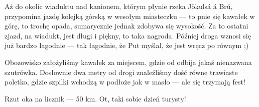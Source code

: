 
Aż do okolic wiaduktu nad kanionem, którym płynie rzeka Jökulsá á Brú,  przypomina jazdę kolejką górską w wesołym miasteczku --- to pnie się kawałek w górę, to trochę opada, sumarycznie jednak zdobywa się wysokość. Za to ostatni zjazd, na wiadukt, jest długi i piękny, to taka nagroda. Później droga wznosi się już bardzo łagodnie --- tak łagodnie, że Put myślał, że jest wręcz po równym ;)

Obozowisko założyliśmy kawałek za miejscem, gdzie od  odbija jakaś nienazwana szutrówka. Dosłownie dwa metry od drogi znaleźliśmy dość równe trawiaste poletko, gdzie szpilki wchodzą w podłoże jak w masło --- ale się trzymają fest!

Rzut oka na licznik --- 50 km. Ot, taki sobie dzień turysty!

